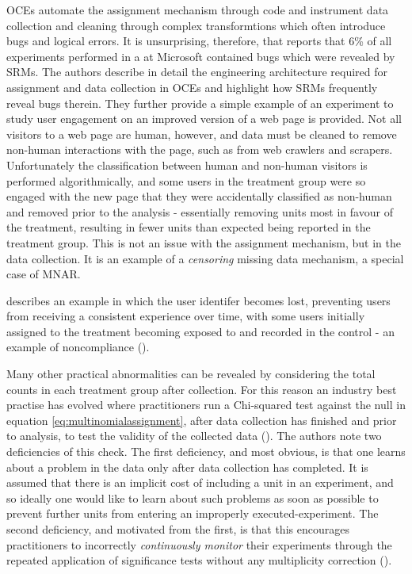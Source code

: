 \documentclass[11pt]{article}
\begin{document}
OCEs automate the assignment mechanism through code and instrument data collection and cleaning through complex transformtions which often introduce bugs and logical errors.
It is unsurprising, therefore, that \cite{fabijan} reports that 6\% of all experiments performed in a at Microsoft contained bugs which were revealed by SRMs.
The authors describe in detail the engineering architecture required for assignment and data collection in OCEs and highlight how SRMs frequently reveal bugs therein.
They further provide a simple example of an experiment to study user engagement on an improved version of a web page is provided.
Not all visitors to a web page are human, however, and data must be cleaned to remove non-human interactions with the page, such as from web crawlers and scrapers.
Unfortunately the classification between human and non-human visitors is performed algorithmically, and some users in the treatment group were so engaged with the new page that they were accidentally classified as non-human and removed prior to the analysis - essentially removing units most in favour of the treatment, resulting in fewer units than expected being reported in the treatment group.
This is not an issue with the assignment mechanism, but in the data collection.
It is an example of a \textit{censoring} missing data mechanism, a special case of MNAR.

\cite{zhao} describes an example in which the user identifer becomes lost, preventing users from receiving a consistent experience over time, with some users initially assigned to the treatment becoming exposed to and recorded in the control - an example of noncompliance (\cite{imbens}).


Many other practical abnormalities can be revealed by considering the total counts in each treatment group after collection.
For this reason an industry best practise has evolved where practitioners run a Chi-squared test against the null in equation \eqref{eq:multinomialassignment}, after data collection has finished and prior to analysis, to test the validity of the collected data (\cite{linkedin}).
The authors note two deficiencies of this check.
The first deficiency, and most obvious, is that one learns about a problem in the data only after data collection has completed.
It is assumed that there is an implicit cost of including a unit in an experiment, and so ideally one would like to learn about such problems as soon as possible to prevent further units from entering an improperly executed-experiment.
The second deficiency, and motivated from the first, is that this encourages practitioners to incorrectly \textit{continuously monitor} their experiments through the repeated application of significance tests without any multiplicity correction (\cite{armitage}).
\end{document}
